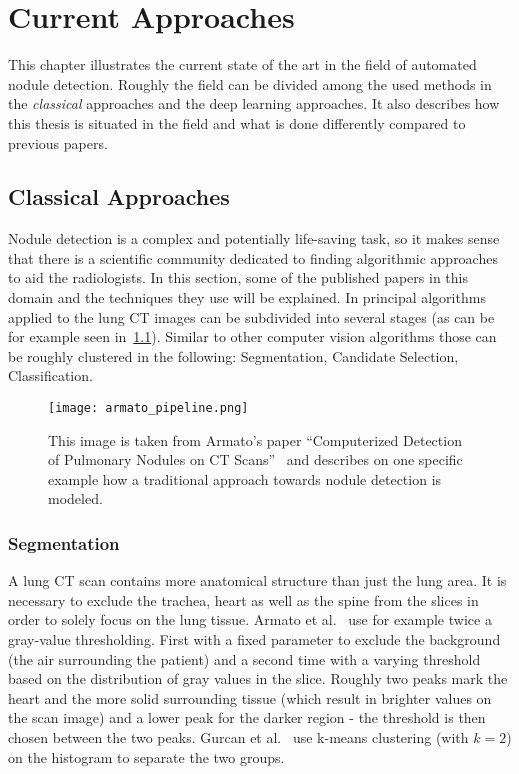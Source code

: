 \documentclass[main.tex]{subfiles}
\begin{document}
\chapter{Current Approaches}\label{chap:approaches}
This chapter illustrates the current state of the art in the field of automated nodule detection. Roughly the field can be divided among the used methods in the \emph{classical} approaches and the deep learning approaches. It also describes how this thesis is situated in the field and what is done differently compared to previous papers.

\section{Classical Approaches}
Nodule detection is a complex and potentially life-saving task, so it makes sense that there is a scientific community dedicated to finding algorithmic approaches to aid the radiologists. In this section, some of the published papers in this domain and the techniques they use will be explained. In principal algorithms applied to the lung CT images can be subdivided into several stages (as can be for example seen in~\ref{fig:pipeline}). Similar to other computer vision algorithms those can be roughly clustered in the following: Segmentation, Candidate Selection, Classification.


\begin{figure}[ht]
\centering
\texttt{[image: armato\_pipeline.png]}
\caption{This image is taken from Armato's paper ``Computerized Detection
of Pulmonary Nodules on CT Scans''~\cite{armato1999computerized} and describes on one specific example how a traditional approach towards nodule detection is modeled.}
\label{fig:pipeline}
\end{figure}


\subsection{Segmentation}
A lung CT scan contains more anatomical structure than just the lung area. It is necessary to exclude the trachea, heart as well as the spine from the slices in order to solely focus on the lung tissue. Armato et al.~\cite{armato1999computerized,armato2001automated} use for example twice a gray-value thresholding. First with a fixed parameter to exclude the background (the air surrounding the patient) and a second time with a varying threshold based on the distribution of gray values in the slice. Roughly two peaks mark the heart and the more solid surrounding tissue (which result in brighter values on the scan image) and a lower peak for the darker region - the threshold is then chosen between the two peaks. Gurcan et al.~\cite{gurcan2002lung} use k-means clustering (with $k=2$) on the histogram to separate the two groups. 
\end{document}
